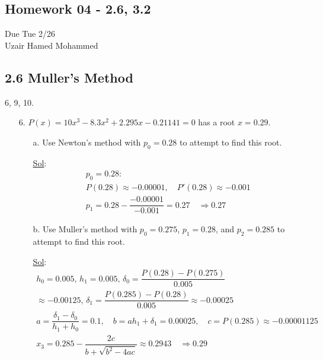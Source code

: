 \begin{center}
  \section*{Homework 04 - 2.6, 3.2}
  Due Tue 2/26 \\
  Uzair Hamed Mohammed
\end{center}

\subsection*{2.6 Muller's Method}

6, 9, 10.

\begin{enumerate}
  \item[6.] \( P(x) = 10 x^3 - 8.3 x^2 + 2.295x - 0.21141 = 0 \) has
    a root \( x = 0.29 \).
    \begin{enumerate}
      \item[a.] Use Newton's method with \( p_0 = 0.28 \) to attempt
        to find this root.

        \underline{Sol}:\\
        \[
          \begin{array}{l}
            p_0 = 0.28: \\
            P(0.28) \approx -0.00001, \quad P'(0.28) \approx -0.001 \\
            p_1 = 0.28 - \dfrac{-0.00001}{-0.001} = 0.27 \quad
            \Rightarrow \boxed{0.27}
          \end{array}
        \]

      \item[b.] Use Muller's method with \( p_0 = 0.275 \), \( p_1 =
        0.28 \), and \( p_2 = 0.285 \) to attempt to find this root.

        \underline{Sol}:\\
        \[
          \begin{array}{l}
            h_0 = 0.005, \, h_1 = 0.005, \, \delta_0 =
            \dfrac{P(0.28)-P(0.275)}{0.005} \\ \approx -0.00125, \,
            \delta_1 = \dfrac{P(0.285)-P(0.28)}{0.005} \approx -0.00025 \\
            a = \dfrac{\delta_1 - \delta_0}{h_1 + h_0} = 0.1, \quad b
            = a h_1 + \delta_1 = 0.00025, \quad c = P(0.285) \approx
            -0.00001125 \\
            x_3 = 0.285 - \dfrac{2c}{b + \sqrt{b^2 - 4ac}} \approx
            0.2943 \quad \Rightarrow \boxed{0.29}
          \end{array}
        \]


\end{enumerate}
\end{enumerate}
